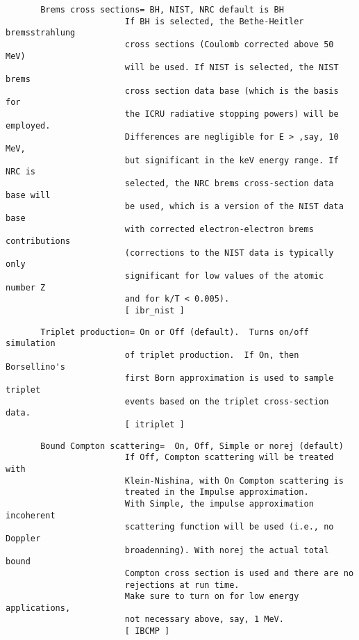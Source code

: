 \begin{verbatim}
       Brems cross sections= BH, NIST, NRC default is BH
                        If BH is selected, the Bethe-Heitler bremsstrahlung
                        cross sections (Coulomb corrected above 50 MeV)
                        will be used. If NIST is selected, the NIST brems
                        cross section data base (which is the basis for
                        the ICRU radiative stopping powers) will be employed.
                        Differences are negligible for E > ,say, 10 MeV,
                        but significant in the keV energy range. If NRC is
                        selected, the NRC brems cross-section data base will
                        be used, which is a version of the NIST data base
                        with corrected electron-electron brems contributions
                        (corrections to the NIST data is typically only
                        significant for low values of the atomic number Z
                        and for k/T < 0.005).
                        [ ibr_nist ]
\end{verbatim}
\begin{verbatim}
       Triplet production= On or Off (default).  Turns on/off simulation
                        of triplet production.  If On, then Borsellino's
                        first Born approximation is used to sample triplet
                        events based on the triplet cross-section data.
                        [ itriplet ]
\end{verbatim}
\begin{verbatim}
       Bound Compton scattering=  On, Off, Simple or norej (default)
                        If Off, Compton scattering will be treated with
                        Klein-Nishina, with On Compton scattering is
                        treated in the Impulse approximation.
                        With Simple, the impulse approximation incoherent
                        scattering function will be used (i.e., no Doppler
                        broadenning). With norej the actual total bound
                        Compton cross section is used and there are no
                        rejections at run time.
                        Make sure to turn on for low energy applications,
                        not necessary above, say, 1 MeV.
                        [ IBCMP ]
\end{verbatim}
